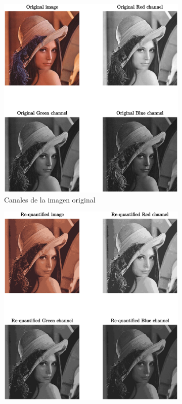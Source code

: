 \documentclass[11pt]{article} %
\begin{document}
\begin{figure}[h]
    \centering
    \begin{subfigure}[b]{0.435\textwidth}
        \includegraphics[width=\textwidth]{../src/fig/22_original_lena.eps}
        \caption[]{Canales de la imagen original}
        \label{fig:22:original:rgb}
    \end{subfigure}
    \quad
    \begin{subfigure}[b]{0.435\textwidth}
        \includegraphics[width=\textwidth]{../src/fig/22_requantified_lena.eps}

\end{subfigure}
\end{figure}
\end{document}

